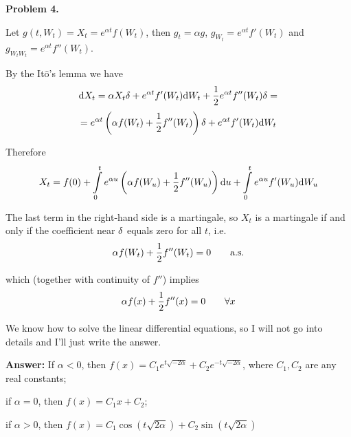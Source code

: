 \documentclass[pdftex,12pt,a4paper]{article}
\begin{document}
\textbf{Problem 4.}\par
Let $g(t,W_{t}) = X_{t} = e^{\alpha t}f(W_{t})$, then $g_{t} = \alpha g$, $g_{W_{t}} = e^{\alpha t}f'(W_{t})$ and $g_{W_{t}W_{t}} = e^{\alpha t}f''(W_{t})$.\par
By the It$\hat{\mbox{o}}$'s lemma we have
$$
\mathrm{d}X_{t} = \alpha X_{t}\delta + e^{\alpha t}f'(W_{t})\mathrm{d}W_{t} + \frac{\displaystyle 1}{\displaystyle 2}e^{\alpha t}f''(W_{t})\delta =$$ $$= e^{\alpha t}\left(\alpha f(W_{t}) + \frac{\displaystyle 1}{\displaystyle 2}f''(W_{t})\right)\delta + e^{\alpha t}f'(W_{t})\mathrm{d}W_{t}
$$\par
Therefore
$$
X_{t} = f(0) + \int\limits_{0}^{t}e^{\alpha u}\left(\alpha f(W_{u}) + \frac{\displaystyle 1}{\displaystyle 2}f''(W_{u})\right)\mathrm{d}u + \int\limits_{0}^{t}e^{\alpha u}f'(W_{u})\mathrm{d}W_{u}
$$
\par
The last term in the right-hand side is a martingale, so $X_{t}$ is a martingale if and only if the coefficient near $\delta$ equals zero for all $t$, i.e.
$$
\alpha f(W_{t}) + \frac{\displaystyle 1}{\displaystyle 2}f''(W_{t}) = 0 \qquad \mbox{a.s.}
$$\par
which (together with continuity of $f''$) implies
$$
\alpha f(x) + \frac{\displaystyle 1}{\displaystyle 2}f''(x) = 0\qquad \forall x
$$
\par
We know how to solve the linear differential equations, so I will not go into details and I'll just write the answer.\[\]\par
\textbf{Answer:} If $\alpha < 0$, then $f(x) = C_{1}e^{t\sqrt{-2\alpha}} + C_{2}e^{-t\sqrt{-2\alpha}}$, where $C_{1}, C_{2}$ are any real constants;\par
if $\alpha = 0$, then $f(x) = C_{1}x + C_{2}$;\par
if $\alpha > 0$, then $f(x) = C_{1}\cos(t\sqrt{2\alpha}) + C_{2}\sin(t\sqrt{2\alpha})$
\end{document}
